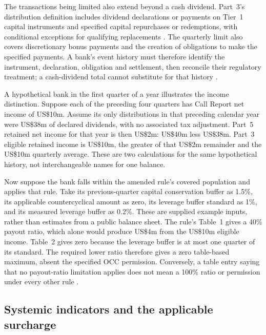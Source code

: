The transactions being limited also extend beyond a cash dividend. Part~3's
distribution definition includes dividend declarations or payments on Tier~1
capital instruments and specified capital repurchases or redemptions, with
conditional exceptions for qualifying replacements
\citep[12~CFR~3.2]{occcapitaldefinitions2026}. The quarterly limit also
covers discretionary bonus payments and the creation of obligations to make
the specified payments. A bank's event history must therefore identify the
instrument, declaration, obligation and settlement, then reconcile their
regulatory treatment; a cash-dividend total cannot substitute for that history
\citep[12~CFR~3.11(a)(4)]{occcapitalpayout2026}.

A hypothetical bank in the first quarter of a year illustrates the income
distinction. Suppose each of the preceding four quarters has Call Report net
income of US\$10m. Assume its only distributions in that preceding calendar
year were US\$38m of declared dividends, with no associated tax adjustment.
Part~5 retained net income for that year is then US\$2m: US\$40m less
US\$38m. Part~3 eligible retained income is US\$10m, the greater of that
US\$2m remainder and the US\$10m quarterly average. These are two calculations
for the same hypothetical history, not interchangeable names for one balance.

Now suppose the bank falls within the amended rule's covered population and
applies that rule. Take its previous-quarter capital conservation buffer as
1.5\%, its applicable countercyclical amount as zero, its leverage buffer
standard as 1\%, and its measured leverage buffer as 0.2\%. These are supplied
example inputs, rather than estimates from a public balance sheet. The rule's Table~1
gives a 40\% payout ratio, which alone would produce US\$4m from the
US\$10m eligible income. Table~2 gives zero because the leverage buffer is
at most one quarter of its standard. The required lower ratio therefore gives
a zero table-based maximum, absent the specified OCC permission. Conversely,
a table entry saying that no payout-ratio limitation applies does not mean a
100\% ratio or permission under every other rule
\citep[12~CFR~3.11(a)(4), (c), Tables~1--2]{occcapitalpayout2026}.


\subsection{Systemic indicators and the applicable surcharge}
\label{sec:bank-systemic-surcharge}

